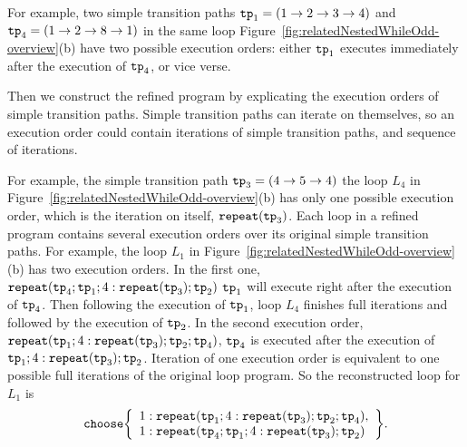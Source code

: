 For example, two simple transition paths $\mathtt{tp}_1 = (1 \to 2 \to 3 \to 4)$ and 
$\mathtt{tp}_4 = (1 \to 2 \to 8 \to 1)$ in the same loop Figure~\ref{fig:relatedNestedWhileOdd-overview}(b) have two possible execution orders:
either $\mathtt{tp}_1$ executes immediately after the execution of $\mathtt{tp}_4$, or vice verse.

Then we construct the refined program by explicating the execution orders of simple transition paths.
Simple transition paths can iterate on themselves, so an execution order could
contain iterations of simple transition paths, and sequence of iterations.

For example, the simple transition path $\mathtt{tp}_3 = (4 \to 5 \to 4)$
the loop $L_4$ in Figure~\ref{fig:relatedNestedWhileOdd-overview}(b) has only one possible execution order,
which is the iteration on itself, $\mathtt{repeat}(\mathtt{tp}_3)$.
Each loop in a refined program contains several execution orders over its original simple transition paths.
For example, the loop $L_1$ in Figure~\ref{fig:relatedNestedWhileOdd-overview}(b)
has two execution orders. In the first one,
$\mathtt{repeat}(\mathtt{tp}_4; \mathtt{tp}_1; 4:\mathtt{repeat}(\mathtt{tp}_3); \mathtt{tp}_2)$ 
$\mathtt{tp}_1$ will execute right after the execution of $\mathtt{tp}_4$.
Then following the execution of $\mathtt{tp}_1$, loop $L_4$ finishes full iterations and followed by the execution of $\mathtt{tp}_2$.
In the second execution order,
$\mathtt{repeat}(\mathtt{tp}_1; 4:\mathtt{repeat}(\mathtt{tp}_3); \mathtt{tp}_2; \mathtt{tp}_4)$,
$\mathtt{tp}_4$ is executed after the execution of $\mathtt{tp}_1; 4:\mathtt{repeat}(\mathtt{tp}_3); \mathtt{tp}_2$.
Iteration of one execution order is equivalent to one possible full iterations of the original loop program.
So the reconstructed loop for $L_1$ is 
\[
\rpchoose{ 
 \begin{array}{l}
 1: \rprepeat(\tpath_1; 4:\rprepeat(\tpath_3); \tpath_2; \tpath_4), \\
 1: \rprepeat(\tpath_4; \tpath_1; 4:\rprepeat(\tpath_3); \tpath_2) 
 \end{array}
 }.
\]

